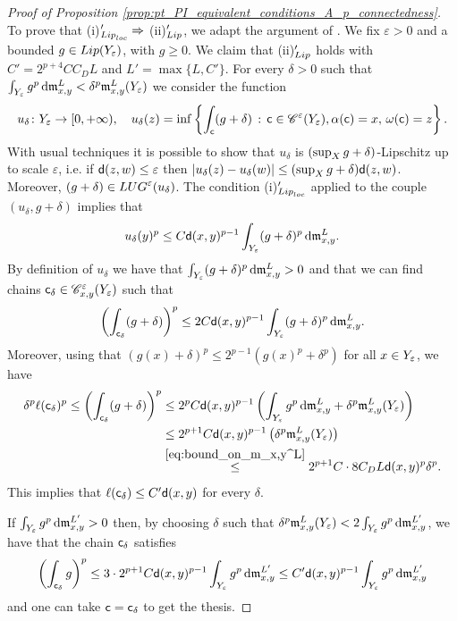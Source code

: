 \documentclass[12pt]{amsart}
\newcommand{\sfd}{{\sf d}}
\renewcommand{\d}{{\mathrm d}}
\newcommand{\X}{{\rm X}}
\newcommand{\Y}{{\rm Y}}
\newcommand{\Lip}{{\rm Lip}}
\newcommand{\loc}{{\rm loc}}
\newcommand{\mm}{\mathfrak m}
\theoremstyle{definition}
\newcommand{\sfc}{{\sf c}}
\newcommand{\Chain}[1]{\mathscr{C}^{#1}}
\newcommand{\LUG}[1]{{\rm LUG}^{#1}}
\begin{document}
\begin{proof}[Proof of Proposition \ref{prop:pt_PI_equivalent_conditions_A_p_connectedness}]
    To prove that (i)$'_{\Lip_\loc} \Rightarrow$ (ii)$'_{\Lip}$, we adapt the argument of \cite[Theorem 1.5]{ErikssonBique2019II}. We fix $\varepsilon >0$ and a bounded $g\in \Lip(\Y_\varepsilon)$, with $g\ge 0$. We claim that (ii)$'_\Lip$ holds with $C' = 2^{p+4}CC_DL$ and $L'= \max\{L,C'\}$.    
    For every $\delta > 0$ such that $\int_{\Y_\varepsilon} g^p\,\d\mm_{x,y}^{L} < \delta^p \mm_{x,y}^{L}(\Y_\varepsilon)$ we consider the function
    $$u_\delta\colon \Y_\varepsilon \to [0,+\infty),\quad u_\delta(z) = \inf\left\{ \int_\sfc (g + \delta)\,:\, \sfc \in \Chain{\varepsilon}(\Y_\varepsilon), \alpha(\sfc) = x,\,\omega(\sfc)=z\right\}.$$
    With usual techniques it is possible to show that $u_\delta$ is $(\sup_\X g + \delta)$-Lipschitz up to scale $\varepsilon$, i.e. if $\sfd(z,w) \le \varepsilon$ then $\vert u_\delta(z) - u_\delta(w)\vert \le (\sup_\X g + \delta) \sfd(z,w)$. 
    Moreover, $(g + \delta)\in \LUG{\varepsilon}(u_\delta)$. The condition (i)$'_{\Lip_\loc}$ applied to the couple $(u_\delta,g + \delta)$ implies that 
    $$u_\delta(y)^p \le C\sfd(x,y)^{p-1}\int_{\Y_\varepsilon} (g + \delta)^p\,\d\mm_{x,y}^L.$$ By definition of $u_\delta$ we have that $\int_{\Y_\varepsilon} (g + \delta)^p\,\d\mm_{x,y}^{L} > 0$ and that we can find chains $\sfc_\delta \in \Chain{\varepsilon}_{x,y}(\Y_\varepsilon)$ such that 
    $$\left(\int_{\sfc_\delta} (g + \delta)\right)^p \le 2C\sfd(x,y)^{p-1}\int_{\Y_\varepsilon} (g + \delta)^p\,\d\mm_{x,y}^L.$$
    Moreover, using that $(g(x)+\delta)^p \le 2^{p-1}(g(x)^p + \delta^p)$ for all $x \in \Y_\varepsilon$, we have
    \begin{equation}
        \label{eq:chains_of_bounded_length}
        \begin{aligned}
            \delta^p\ell(\sfc_\delta)^p \le \left(\int_{\sfc_\delta} (g + \delta)\right)^p &\le 2^{p}C\sfd(x,y)^{p-1}\left(\int_{\Y_{\varepsilon}} g^p \,\d\mm_{x,y}^L + \delta^p\mm_{x,y}^L(\Y_\varepsilon)\right) \\
            &\le 2^{p + 1}C\sfd(x,y)^{p-1}\left( \delta^p\mm_{x,y}^L(\Y_\varepsilon)\right)\\            &\stackrel{\eqref{eq:bound_on_m_x,y^L}}{\le} 2^{p+1}C\cdot 8C_DL\sfd(x,y)^p \delta^p.
        \end{aligned}
    \end{equation}
    This implies that $\ell(\sfc_\delta) \le C'\sfd(x,y)$ for every $\delta$. 
    
    If $\int_{\Y_\varepsilon} g^p\,\d\mm_{x,y}^{L'} > 0$ then, by choosing $\delta$ such that $\delta^p\mm_{x,y}^L(\Y_\varepsilon) < 2\int_{\Y_\varepsilon} g^p \,\d\mm_{x,y}^{L'}$, we have that the chain $\sfc_\delta$ satisfies
    $$\left(\int_{\sfc_\delta} g\right)^p \le 3\cdot2^{p+1}C\sfd(x,y)^{p-1}\int_{\Y_\varepsilon} g^p\,\d\mm_{x,y}^{L'} \le C'\sfd(x,y)^{p-1}\int_{\Y_\varepsilon} g^p\,\d\mm_{x,y}^{L'}$$
    and one can take $\sfc = \sfc_\delta$ to get the thesis.
    

\end{proof}
\end{document}
